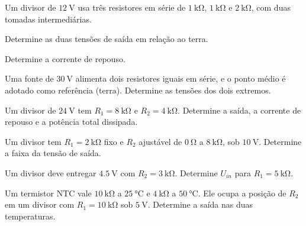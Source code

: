 \blocoaplicacao
\begin{questao}[2]{}

Um divisor de $\SI{12}{\volt}$ usa três resistores em série de
$\SI{1}{\kilo\ohm}$, $\SI{1}{\kilo\ohm}$ e $\SI{2}{\kilo\ohm}$, com duas
tomadas intermediárias.
\begin{itensq}
\item Determine as duas tensões de saída em relação ao terra.
\item Determine a corrente de repouso.
\end{itensq}


\end{questao}
\begin{questao}[2]{}

Uma fonte de $\SI{30}{\volt}$ alimenta dois resistores iguais em série, e o
ponto médio é adotado como referência (terra). Determine as tensões dos dois
extremos.


\end{questao}
\begin{questao}[2]{}

Um divisor de $\SI{24}{\volt}$ tem $R_1=\SI{8}{\kilo\ohm}$ e
$R_2=\SI{4}{\kilo\ohm}$. Determine a saída, a corrente de repouso e a potência
total dissipada.


\end{questao}
\begin{questao}[2]{}

Um divisor tem $R_1=\SI{2}{\kilo\ohm}$ fixo e $R_2$ ajustável de
$\SI{0}{\ohm}$ a $\SI{8}{\kilo\ohm}$, sob $\SI{10}{\volt}$. Determine a faixa
da tensão de saída.


\end{questao}
\begin{questao}[2]{}

Um divisor deve entregar $\SI{4.5}{\volt}$ com $R_2=\SI{3}{\kilo\ohm}$.
Determine $U_{in}$ para $R_1=\SI{5}{\kilo\ohm}$.


\end{questao}
\begin{questao}[2]{}

Um termistor NTC vale $\SI{10}{\kilo\ohm}$ a $\SI{25}{\celsius}$ e
$\SI{4}{\kilo\ohm}$ a $\SI{50}{\celsius}$. Ele ocupa a posição de $R_2$ em um
divisor com $R_1=\SI{10}{\kilo\ohm}$ sob $\SI{5}{\volt}$. Determine a saída nas
duas temperaturas.


\end{questao}
